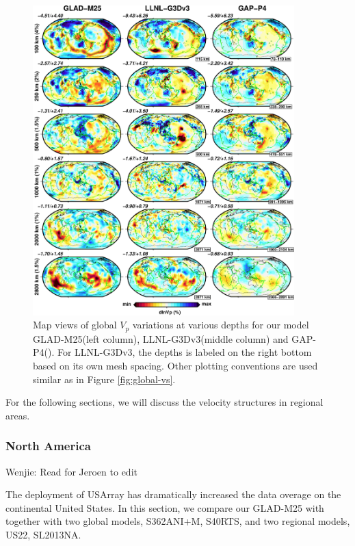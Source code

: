 \documentclass[extra,mreferee]{gji}
\begin{document}
\begin{figure}
\includegraphics[width=0.9\textwidth]{figures/depth_slice/globe_vp_LLNL-GAP.pdf}
  \caption{Map views of global $V_p$ variations at various depths for our model
  GLAD-M25(left column), LLNL-G3Dv3(middle column) \citep{simmons2012llnl} and
  GAP-P4(\citep{fukao2013subducted}).
  For LLNL-G3Dv3, the depths is labeled on the right
  bottom based on its own mesh spacing. Other plotting conventions are used
  similar as in Figure \ref{fig:global-vs}.}
\label{fig:global-vp}
\centering
\end{figure}

For the following sections, we will discuss the velocity structures in regional
areas.

\subsubsection{North America}

{\color{Red} Wenjie: Read for Jeroen to edit}

The deployment of USArray has dramatically increased the data overage on the
continental United States. In this section, we compare our GLAD-M25 with
together with two global models, S362ANI+M, S40RTS, and two regional models,
US22\citep{zhu2017radial}, SL2013NA\citep{schaeffer2014imaging}.
\end{document}
